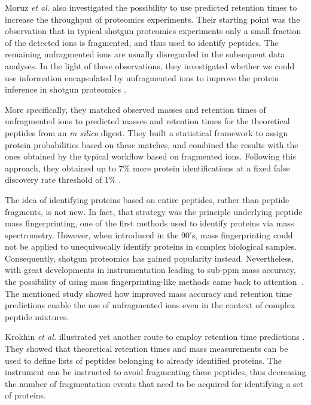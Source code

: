 \documentclass[a4paper]{article}
\begin{document}
Moruz {\em et al.} also investigated the possibility to use predicted
retention times to increase the throughput of proteomics
experiments. Their starting point was the observation that in typical
shotgun proteomics experiments only a small fraction of the detected
ions is fragmented, and thus used to identify peptides. The remaining
unfragmented ions are usually disregarded in the subsequent data
analyses. In the light of these observations, they investigated
whether we could use information encapsulated by unfragmented ions to
improve the protein inference in shotgun proteomics \cite{mf}.



More specifically, they matched observed masses and retention times of
unfragmented ions to predicted masses and retention times for the
theoretical peptides from an {\it in silico} digest. They built a
statistical framework to assign protein probabilities based on these
matches, and combined the results with the ones obtained by the
typical workflow based on fragmented ions. Following this approach, they
obtained up to 7\% more protein identifications at a fixed false
discovery rate threshold of 1\% \cite{mf}.

The idea of identifying proteins based on entire peptides, rather than
peptide fragments, is not new. In fact, that strategy was the
principle underlying peptide mass fingerprinting, one of the first
methods used to identify proteins via mass spectrometry. However, when
introduced in the 90's, mass fingerprinting could not be applied to
unequivocally identify proteins in complex biological
samples. Consequently, shotgun proteomics has gained popularity
instead. Nevertheless, with great developments in instrumentation
leading to sub-ppm mass accuracy, the possibility of using mass
fingerprinting-like methods came back to attention~\cite{iamt1}. The
mentioned study showed how improved mass accuracy and retention time
predictions enable the use of unfragmented ions even in the context of
complex peptide mixtures.

Krokhin {\em et al.} illustrated yet another route to employ retention time
predictions \cite{krokhin200612, McQueen2012}. They showed that
theoretical retention times and mass measurements can be used to
define lists of peptides belonging to already identified proteins. The
instrument can be instructed to avoid fragmenting these peptides, thus
decreasing the number of fragmentation events that need to be acquired
for identifying a set of proteins.
\end{document}
